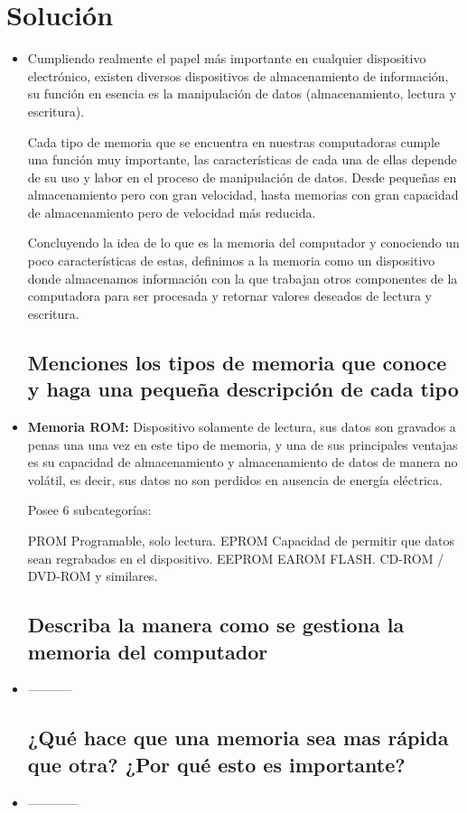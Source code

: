 \section{Solución}
\begin{itemize}

    \subsection{Defina que es la memoria del computador}
    \item Cumpliendo realmente el papel más importante en cualquier dispositivo electrónico, existen diversos dispositivos de almacenamiento de información, su función en esencia es la manipulación de datos (almacenamiento, lectura y escritura).
    
    Cada tipo de memoria que se encuentra en nuestras computadoras cumple una función muy importante, las características de cada una de ellas depende de su uso y labor en el proceso de manipulación de datos. Desde pequeñas en almacenamiento pero con gran velocidad, hasta memorias con gran capacidad de almacenamiento pero de velocidad más reducida.
    
    Concluyendo la idea de lo que es la memoria del computador y conociendo un poco características de estas, definimos a la memoria como un dispositivo donde almacenamos información con la que trabajan otros componentes de la computadora para ser procesada y retornar valores deseados de lectura y escritura.
    
    
    
    \subsection{ Menciones los tipos de memoria que conoce y haga una pequeña descripción de cada tipo}
    \item \textbf{Memoria ROM: } Dispositivo solamente de lectura, sus datos son gravados a penas una una vez en este tipo de memoria, y una de sus principales ventajas es su capacidad de almacenamiento y almacenamiento de datos de manera no volátil, es decir, sus datos no son perdidos en ausencia de energía eléctrica.
    
    Posee 6 subcategorías:
    
    PROM Programable, solo lectura.
    EPROM Capacidad de permitir que datos sean regrabados en el dispositivo.
    EEPROM
    EAROM
    FLASH.
    CD-ROM / DVD-ROM y similares.
    
    
    \subsection{ Describa la manera como se gestiona la memoria del computador}
    \item -----------
    
    
    \subsection{ ¿Qué hace que una memoria sea mas rápida que otra? ¿Por qué esto es importante?}
    \item ------------
    
    
\end{itemize}